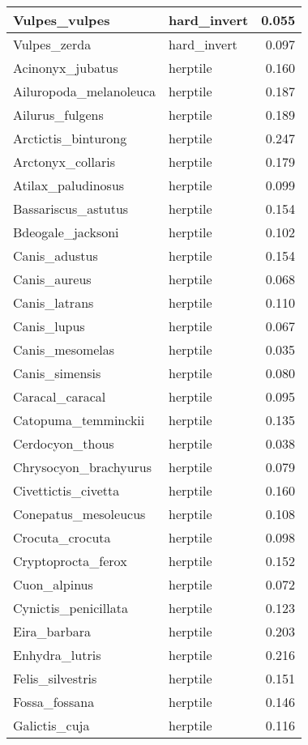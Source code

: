 \begin{table}
\begin{tabular}[t]{l|l|r}
\hline
Vulpes\_vulpes & hard\_invert & 0.055\\
\hline
Vulpes\_zerda & hard\_invert & 0.097\\
\hline
Acinonyx\_jubatus & herptile & 0.160\\
\hline
Ailuropoda\_melanoleuca & herptile & 0.187\\
\hline
Ailurus\_fulgens & herptile & 0.189\\
\hline
Arctictis\_binturong & herptile & 0.247\\
\hline
Arctonyx\_collaris & herptile & 0.179\\
\hline
Atilax\_paludinosus & herptile & 0.099\\
\hline
Bassariscus\_astutus & herptile & 0.154\\
\hline
Bdeogale\_jacksoni & herptile & 0.102\\
\hline
Canis\_adustus & herptile & 0.154\\
\hline
Canis\_aureus & herptile & 0.068\\
\hline
Canis\_latrans & herptile & 0.110\\
\hline
Canis\_lupus & herptile & 0.067\\
\hline
Canis\_mesomelas & herptile & 0.035\\
\hline
Canis\_simensis & herptile & 0.080\\
\hline
Caracal\_caracal & herptile & 0.095\\
\hline
Catopuma\_temminckii & herptile & 0.135\\
\hline
Cerdocyon\_thous & herptile & 0.038\\
\hline
Chrysocyon\_brachyurus & herptile & 0.079\\
\hline
Civettictis\_civetta & herptile & 0.160\\
\hline
Conepatus\_mesoleucus & herptile & 0.108\\
\hline
Crocuta\_crocuta & herptile & 0.098\\
\hline
Cryptoprocta\_ferox & herptile & 0.152\\
\hline
Cuon\_alpinus & herptile & 0.072\\
\hline
Cynictis\_penicillata & herptile & 0.123\\
\hline
Eira\_barbara & herptile & 0.203\\
\hline
Enhydra\_lutris & herptile & 0.216\\
\hline
Felis\_silvestris & herptile & 0.151\\
\hline
Fossa\_fossana & herptile & 0.146\\
\hline
Galictis\_cuja & herptile & 0.116\\

\end{tabular}
\end{table}
